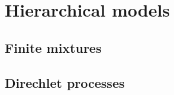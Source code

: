 \chapter{Hierarchical models}\label{chap11}

\section{Finite mixtures}\label{sec11_1}

\section{Direchlet processes}\label{sec11_2}